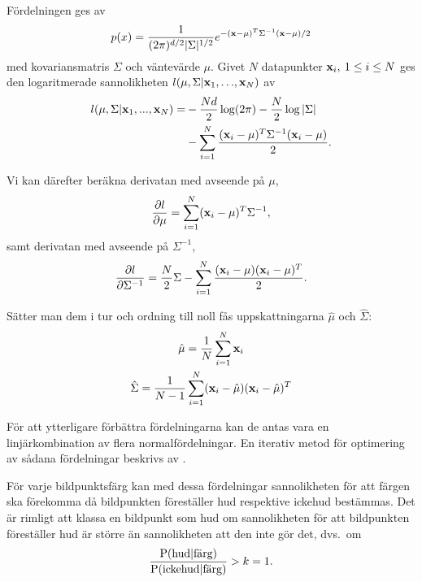 \documentclass[../rapport_MVEX01-11-05]{subfiles}
\begin{document}
Fördelningen ges av
\begin{equation*}
  p(x)=\frac{1}{(2\pi)^{d/2}|\Sigma|^{1/2}}e^{-(\mathbf{x}-\mu)^T\Sigma^{-1}(\mathbf{x}-\mu)/2}
\end{equation*}
med kovariansmatris $\Sigma$ och väntevärde $\mu$.
Givet $N$ datapunkter $\mathbf{x}_i,\:1\leq i\leq N$ ges den logaritmerade
sannolikheten $l(\mu,\Sigma|\mathbf{x}_1,{\ldots} ,\mathbf{x}_N)$ av
\begin{equation*}
  \begin{aligned}
  l(\mu,\Sigma|\mathbf{x}_1,...,\mathbf{x}_N) = &-\frac{Nd}{2}\log(2\pi)-\frac{N}{2}\log|\Sigma|\\
                              &-\sum_{i=1}^N\frac{(\mathbf{x}_i-\mu)^T\Sigma^{-1}(\mathbf{x}_i-\mu)}{2}.
  \end{aligned}
\end{equation*}

Vi kan därefter beräkna derivatan med avseende på $\mu$,
\begin{equation*}
  \frac{\partial l}{\partial \mu}=\sum_{i=1}^N(\mathbf{x}_i-\mu)^T\Sigma^{-1},
\end{equation*}
samt derivatan med avseende på $\Sigma^{-1}$,
\begin{equation*}
  \frac{\partial l}{\partial \Sigma^{-1}}=\frac{N}{2}\Sigma
  -\sum_{i=1}^N\frac{(\mathbf{x}_i-\mu)(\mathbf{x}_i-\mu)^T}{2}.
\end{equation*}

Sätter man dem i tur och ordning till noll fås uppskattningarna
$\hat\mu$ och $\hat\Sigma$:
\begin{gather*}
  \hat\mu    =\frac{1}{N}\sum_{i=1}^N\mathbf{x}_i\\
  \hat\Sigma =\frac{1}{N-1}\sum_{i=1}^N(\mathbf{x}_i-\hat\mu)(\mathbf{x}_i-\hat\mu)^T
\end{gather*}

För att ytterligare förbättra fördelningarna kan de antas vara
en linjärkombination av flera normalfördelningar. En iterativ metod för optimering av
sådana fördelningar beskrivs av .

För varje bildpunktsfärg kan med dessa fördelningar sannolikheten för att färgen ska
förekomma då bildpunkten föreställer hud
respektive ickehud bestämmas. Det är rimligt att klassa en bildpunkt som
hud om sannolikheten för att bildpunkten föreställer hud är större än
sannolikheten att den inte gör det, dvs.~om
\begin{equation*}
	\frac{\mathrm{P}(\textrm{hud}|\textrm{färg})}{\mathrm{P}(\textrm{ickehud}|\textrm{färg})} > k = 1.
\end{equation*}
\end{document}

